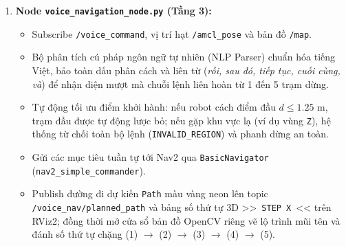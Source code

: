\documentclass[11pt,a4paper]{article}
\begin{document}
\begin{enumerate}
  \item \textbf{Node \texttt{voice\_navigation\_node.py} (Tầng 3):}
  \begin{itemize}
    \item Subscribe \texttt{/voice\_command}, vị trí hạt \texttt{/amcl\_pose} và bản đồ \texttt{/map}.
    \item Bộ phân tích cú pháp ngôn ngữ tự nhiên (NLP Parser) chuẩn hóa tiếng Việt, bảo toàn dấu phân cách và liên từ (\textit{rồi, sau đó, tiếp tục, cuối cùng, và}) để nhận diện mượt mà chuỗi lệnh liên hoàn từ 1 đến 5 trạm dừng.
    \item Tự động tối ưu điểm khởi hành: nếu robot cách điểm đầu $d \le 1.25\text{ m}$, trạm đầu được tự động lược bỏ; nếu gặp khu vực lạ (ví dụ vùng \texttt{Z}), hệ thống từ chối toàn bộ lệnh (\texttt{INVALID\_REGION}) và phanh dừng an toàn.
    \item Gửi các mục tiêu tuần tự tới Nav2 qua \texttt{BasicNavigator} (\texttt{nav2\_simple\_commander}).
    \item Publish đường đi dự kiến \texttt{Path} màu vàng neon lên topic \texttt{/voice\_nav/planned\_path} và bảng số thứ tự 3D {\normalfont >>~}\texttt{STEP X}{\normalfont~<<} trên RViz2; đồng thời mở cửa sổ bản đồ OpenCV riêng vẽ lộ trình mũi tên và đánh số thứ tự chặng (1) $\to$ (2) $\to$ (3) $\to$ (4) $\to$ (5).
  \end{itemize}
\end{enumerate}
\end{document}
